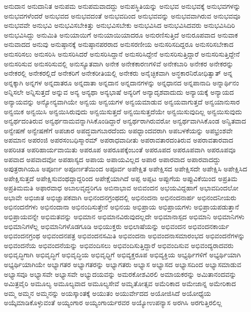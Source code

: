 {ಅನುದಾನ
ಅನುದಾನಿತ
ಅನುಪಮ
ಅನುಪಮವಾದದ್ದು
ಅನುಪಸ್ಥಿತಿಯನ್ನು
ಅನುಭವ
ಅನುಭವಕ್ಕೆ
ಅನುಭವಗಳನ್ನು
ಅನುಭವಗಳೆಂದರೆ
ಅನುಭವದ
ಅನುಭವದಂತೆ
ಅನುಭವದಿಂದ
ಅನುಭವವನ್ನು
ಅನುಭವವಾಗಿರುವ
ಅನುಭವವೂ
ಅನುಭವವೇ
ಅನುಭವಿ
ಅನುಭವಿಸಬೇಕಿತ್ತು
ಅನುಭವಿಸಬೇಕು
ಅನುಭವಿಸಿದ
ಅನುಭವಿಸಿದವರು
ಅನುಭವಿಸಿದಿರಿ
ಅನುಭವಿಸಿದ್ದು
ಅನುಮಿತಿ
ಅನುಯಾಯಿಗೆ
ಅನುಯಾಯಿಯಾದರೂ
ಅನುರಣಿಸುತ್ತಿದೆ
ಅನುರೂಪವಾದ
ಅನುವಾಕ
ಅನುವಾದದ
ಅನುವು
ಅನುಷ್ಠಾನಕ್ಕೆ
ಅನುಷ್ಠಾನಪರರಾದ
ಅನುಸರಣೀಯ
ಅನುಸರಿಸದಿದ್ದರೂ
ಅನುಸರಿಸಬೇಕಾದ
ಅನುಸರಿಸಲು
ಅನುಸರಿಸಿ
ಅನುಸರಿಸಿದರೆ
ಅನುಸರಿಸಿದ್ದಾನೆ
ಅನುಸರಿಸಿದ್ದೇನೆ
ಅನುಸರಿಸುತ್ತಿದ್ದಾರೆ
ಅನುಸರಿಸುತ್ತಿದ್ದೇನೆ
ಅನುಸರಿಸುವ
ಅನುಸರಿಸುವಲ್ಲಿ
ಅನುಸ್ಯೂತವಾಗಿ
ಅನೇಕ
ಅನೇಕಕಾರಣಗಳಿವೆ
ಅನೇಕಬಾರಿ
ಅನೇಕರ
ಅನೇಕರನ್ನು
ಅನೇಕರಲ್ಲಿ
ಅನೇಕರಲ್ಲಿದೆ
ಅನೇಕರಿಗೆ
ಅನೇಕರೀತಿಯಲ್ಲಿ
ಅನೇಕರು
ಅನೈಚ್ಛಿಕವಾಗಿ
ಅನ್ಧಕಾರನಿರೋಧಿತ್ವಾತ್
ಅನ್ನ
ಅನ್ನಕ್ಕಾಗಿ
ಅನ್ನಗಳ
ಅನ್ನದಾತರೂ
ಅನ್ನದಾತಾ
ಅನ್ನದಾನ
ಅನ್ನದಾನಗಳನ್ನು
ಅನ್ನಧಾನದ
ಅನ್ನಪಾನಾದಿ
ಅನ್ನಾರ್ಥಿನಂ
ಅನ್ನಿಸಲೇ
ಅನ್ನಿಸುತ್ತದೆ
ಅನ್ನುವ
ಅನ್ಯ
ಅನ್ಯಥಾ
ಅನ್ಯಭಾಷೆ
ಅನ್ಯರಿಗೆ
ಅನ್ಯಾದೃಶವಾದುದು
ಅನ್ಯಾಯಕ್ಕೆ
ಅನ್ಯಾಯದ
ಅನ್ಯಾಯವನ್ನು
ಅನ್ಯೋನ್ಯವಾಗಿಯೇ
ಅನ್ವಯ
ಅನ್ವಯಗಳ
ಅನ್ವಯಮಾಡುವ
ಅನ್ವಯವಾಗುತ್ತದೆ
ಅನ್ವಯಾನುಸಾರ
ಅನ್ವಯಿಕ
ಅನ್ವಯಿಸಿ
ಅನ್ವಯಿಸಿರುವುದು
ಅನ್ವಯಿಸುತ್ತದೆ
ಅನ್ವಯಿಸುತ್ತದೆಯೇ
ಅನ್ವಯಿಸುವುದಿಲ್ಲ
ಅನ್ವಯಿಸುವುದು
ಅನ್ವರ್ಥದಂತಿರುವ
ಅನ್ವರ್ಥನಾಮವನ್ನಾಗಿಸಿಕೊಂಡಿದ್ದಾರೆ
ಅನ್ವರ್ಥರಾಗಿರುವರೋ
ಅನ್ವರ್ಥವಾಗಿಸಿಕೊಂಡ
ಅನ್ವಿತವಾದ
ಅನ್ವೇಷಣೆ
ಅನ್ವೇಷಣೆಗೆ
ಅಪಚಾರ
ಅಪದ್ಧವಾಗಬಾರದೆಂದು
ಅಪಧ್ಭಾಂದವರಾಗಿ
ಅಪಬಳಕೆಯನ್ನು
ಅಪಭ್ರಂಶವೇ
ಅಪಮಾನ
ಅಪರಂಜಿ
ಅಪರಸಂಬಧಿಸ್ಮಾರಮ್
ಅಪರಾಧವಾದೀತು
ಅಪರಾವತಾರದಂತಿರುವ
ಅಪರಾವತಾರವಾದ
ಅಪರಿಚಿತ
ಅಪರಿಹಾರ್ಯವಾಯಿತು
ಅಪರೂಪ
ಅಪರೂಪಕ್ಕೆಂಬಂತೆ
ಅಪರೂಪದ
ಅಪರೂಪವಾಗಿ
ಅಪರೂಪವೂ
ಅಪವಾದ
ಅಪವಾದವೋ
ಅಪಹಾಸ್ಯದ
ಅಪಾಯ
ಅಪಾಯವಿಲ್ಲದ
ಅಪಾರ
ಅಪಾರವಾದ
ಅಪಾರವಾದದ್ದು
ಅಪುತ್ರರಾಗಿಯೂ
ಅಪೂರ್ಣ
ಅಪೂರ್ಣತೆಯಿಂದ
ಅಪೂರ್ವ
ಅಪೇಕ್ಷಿತ
ಅಪೇಕ್ಷಿಸದ
ಅಪೇಕ್ಷಿಸದೇ
ಅಪೇಕ್ಷಿಸಿ
ಅಪೇಕ್ಷಿಸಿದ
ಅಪೇಕ್ಷಿಸುತ್ತದೆ
ಅಪೇಕ್ಷಿಸುವಂಥದ್ದಾದ್ದರಿಂದ
ಅಪೇಕ್ಷೆಯಾಗಿದೆ
ಅಪ್ಪ
ಅಪ್ಪಟ
ಅಪ್ಪುಗೆಯ
ಅಪ್ಪುವಿಕೆಯಿಂದ
ಅಪ್ರತಿಮ
ಅಪ್ರತಿಮಮತಿ
ಅಫಾರವಾಧ
ಅಬಾಲವೃದ್ಧರಿಗೂ
ಅಬಿನಾಭಾವ
ಅಬಿವಂದನ
ಅಭಯವಿದ್ದಹಾಗೆ
ಅಭಾವದಿಂದಲೋ
ಅಭಾವೇ
ಅಭಿಜಾತ
ಅಭಿಜ್ಞಾಪಕವಾಗಿ
ಅಭಿನಂದನಗ್ರಂಥದಲ್ಲಿ
ಅಭಿನಂದನಾ
ಅಭಿನಂದನಾರ್ಹ
ಅಭಿನಂದನೀಯರು
ಅಭಿನಂದನೆಗಳು
ಅಭಿನಂದಾನಾ
ಅಭಿನಂದಿಸುತ್ತೇನೆ
ಅಭಿನಯ
ಅಭಿಪ್ರಾಯ
ಅಭಿಪ್ರಾಯಗಳು
ಅಭಿಪ್ರಾಯಪಡುತ್ತಾನೆ
ಅಭಿಪ್ರಾಯವನ್ನೇ
ಅಭಿಮತವನ್ನು
ಅಭಿಮಾನ
ಅಭಿಮಾನವಿರುವುದಲ್ಲದೇ
ಅಭಿಮಾನಾಸ್ಪದ
ಅಭಿಮಾನಿ
ಅಭಿಮಾನಿಗಳು
ಅಭಿಮಾನಿಗಳೆಲ್ಲ
ಅಭಿಮಾನಿಗಳೊಡಗೂಡಿ
ಅಭಿಯುಕ್ತರು
ಅಭಿಲಾಷೆಯನ್ನು
ಅಭಿವಂದನ
ಅಭಿವಂದನಕಾರ್ಯ
ಅಭಿವಂದನಗ್ರಂಥ
ಅಭಿವಂದನಪತ್ರ
ಅಭಿವಂದನಸಮಿತಿ
ಅಭಿವಂದನಾ
ಅಭಿವಂದನಾಸಮಾರಂಭದ
ಅಭಿವಂದನೆಗಳನ್ನು
ಅಭಿವಂದನೆಯ
ಅಭಿವಂದನೆಯನ್ನು
ಅಭಿವಂದಿಸಲು
ಅಭಿವಂದಿಸುತ್ತಿದ್ದಾರೆ
ಅಭಿವಂದಿಸುವ
ಅಭಿವಂದ್ಯರಾದವರು
ಅಭಿವೃದ್ಧಿಗಾಗಿ
ಅಭಿವೃದ್ಧಿಗೆ
ಅಭಿವೃದ್ಧಿಯ
ಅಭಿವೃಧ್ಧಿಗೆ
ಅಭಿವ್ಯಕ್ತರೂಪ
ಅಭಿವ್ಯಕ್ತಿಯ
ಅಭ್ಯರ್ಥಿಗಳಿಗೆ
ಅಭ್ಯರ್ಥಿಯಾಗಿ
ಅಭ್ಯರ್ಥಿಯಾಗಿಯೇ
ಅಭ್ಯಾಗತರ
ಅಭ್ಯಾಗತರನ್ನು
ಅಭ್ಯಾಗತರು
ಅಭ್ಯಾಸ
ಅಭ್ಯಾಸದ
ಅಭ್ಯಾಸದಿಂದ
ಅಭ್ಯಾಸಮಾಡುವ
ಅಭ್ಯಾಸವೂ
ಅಭ್ಯಾಸವೇ
ಅಭ್ಯಾಸವೇ
ಅಭ್ಯುದಯವನ್ನು
ಅಮರಕೋಶವಿರಲಿ
ಅಮಾಯಕರನ್ನು
ಅಮಿತಾನಂದವನ್ನು
ಅಮಿತ್ರವೈರಿ
ಅಮೂಲ್ಯ
ಅಮೂಲ್ಯವಾದ
ಅಮೂಲ್ಯಸೇವೆ
ಅಮೃತೋತ್ಸವ
ಅಮೆರಿಕಾದ
ಅಮೇಜಾನ್ನ
ಅಮೇರಿಕಾದ
ಅಮ್ಮ
ಅಮ್ಮನ
ಅಮ್ಮನನ್ನು
ಅಯಸ್ಕಾಂತಕ್ಕೆ
ಅಯುತಂ
ಅಯುರ್ವೇದದ
ಅಯೋಜಿಸಿದೆ
ಅಯೋಧ್ಯೆಯ
ಅಯ್ಕೆಮಾಡಿಕೊಳ್ಳುವಂತೆ
ಅಯ್ಯಂಗಾರ
ಅಯ್ಯಂಗಾರ್ಯರವರ
ಅಯ್ಯೋಉಪನ್ಯಾಸ
ಅರಗಿಸಿ
ಅರಗುತ್ತಿರಲಿಲ್ಲ
}
